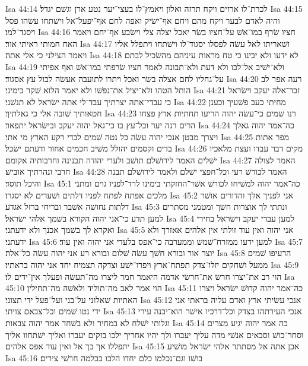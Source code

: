 Isa 44:14  לכרת־לו ארזים ויקח תרזה ואלון ויאמץ־לו בעצי־יער נטע ארן וגשׁם יגדל׃
Isa 44:15  והיה לאדם לבער ויקח מהם ויחם אף־ישׂיק ואפה לחם אף־יפעל־אל וישׁתחו עשׂהו פסל ויסגד־למו׃
Isa 44:16  חציו שׂרף במו־אשׁ על־חציו בשׂר יאכל יצלה צלי וישׂבע אף־יחם ויאמר האח חמותי ראיתי אור׃
Isa 44:17  ושׁאריתו לאל עשׂה לפסלו יסגוד־לו וישׁתחו ויתפלל אליו ויאמר הצילני כי אלי אתה׃
Isa 44:18  לא ידעו ולא יבינו כי טח מראות עיניהם מהשׂכיל לבתם׃
Isa 44:19  ולא־ישׁיב אל־לבו ולא דעת ולא־תבונה לאמר חציו שׂרפתי במו־אשׁ ואף אפיתי על־גחליו לחם אצלה בשׂר ואכל ויתרו לתועבה אעשׂה לבול עץ אסגוד׃
Isa 44:20  רעה אפר לב הותל הטהו ולא־יציל את־נפשׁו ולא יאמר הלוא שׁקר בימיני׃
Isa 44:21  זכר־אלה יעקב וישׂראל כי עבדי־אתה יצרתיך עבד־לי אתה ישׂראל לא תנשׁני׃
Isa 44:22  מחיתי כעב פשׁעיך וכענן חטאותיך שׁובה אלי כי גאלתיך׃
Isa 44:23  רנו שׁמים כי־עשׂה יהוה הריעו תחתיות ארץ פצחו הרים רנה יער וכל־עץ בו כי־גאל יהוה יעקב ובישׂראל יתפאר׃
Isa 44:24  כה־אמר יהוה גאלך ויצרך מבטן אנכי יהוה עשׂה כל נטה שׁמים לבדי רקע הארץ מי אתי׃
Isa 44:25  מפר אתות בדים וקסמים יהולל משׁיב חכמים אחור ודעתם ישׂכל׃
Isa 44:26  מקים דבר עבדו ועצת מלאכיו ישׁלים האמר לירושׁלם תושׁב ולערי יהודה תבנינה וחרבותיה אקומם׃
Isa 44:27  האמר לצולה חרבי ונהרתיך אובישׁ׃
Isa 44:28  האמר לכורשׁ רעי וכל־חפצי ישׁלם ולאמר לירושׁלם תבנה והיכל תוסד׃
Isa 45:1  כה־אמר יהוה למשׁיחו לכורשׁ אשׁר־החזקתי בימינו לרד־לפניו גוים ומתני מלכים אפתח לפתח לפניו דלתים ושׁערים לא יסגרו׃
Isa 45:2  אני לפניך אלך והדורים אושׁר דלתות נחושׁה אשׁבר ובריחי ברזל אגדע׃
Isa 45:3  ונתתי לך אוצרות חשׁך ומטמני מסתרים למען תדע כי־אני יהוה הקורא בשׁמך אלהי ישׂראל׃
Isa 45:4  למען עבדי יעקב וישׂראל בחירי ואקרא לך בשׁמך אכנך ולא ידעתני׃
Isa 45:5  אני יהוה ואין עוד זולתי אין אלהים אאזרך ולא ידעתני׃
Isa 45:6  למען ידעו ממזרח־שׁמשׁ וממערבה כי־אפס בלעדי אני יהוה ואין עוד׃
Isa 45:7  יוצר אור ובורא חשׁך עשׂה שׁלום ובורא רע אני יהוה עשׂה כל־אלה׃
Isa 45:8  הרעיפו שׁמים ממעל ושׁחקים יזלו־צדק תפתח־ארץ ויפרו־ישׁע וצדקה תצמיח יחד אני יהוה בראתיו׃
Isa 45:9  הוי רב את־יצרו חרשׂ את־חרשׂי אדמה היאמר חמר ליצרו מה־תעשׂה ופעלך אין־ידים לו׃
Isa 45:10  הוי אמר לאב מה־תוליד ולאשׁה מה־תחילין׃
Isa 45:11  כה־אמר יהוה קדושׁ ישׂראל ויצרו האתיות שׁאלוני על־בני ועל־פעל ידי תצוני׃
Isa 45:12  אנכי עשׂיתי ארץ ואדם עליה בראתי אני ידי נטו שׁמים וכל־צבאם צויתי׃
Isa 45:13  אנכי העירתהו בצדק וכל־דרכיו אישׁר הוא־יבנה עירי וגלותי ישׁלח לא במחיר ולא בשׁחד אמר יהוה צבאות׃
Isa 45:14  כה אמר יהוה יגיע מצרים וסחר־כושׁ וסבאים אנשׁי מדה עליך יעברו ולך יהיו אחריך ילכו בזקים יעברו ואליך ישׁתחוו אליך יתפללו אך בך אל ואין עוד אפס אלהים׃
Isa 45:15  אכן אתה אל מסתתר אלהי ישׂראל מושׁיע׃
Isa 45:16  בושׁו וגם־נכלמו כלם יחדו הלכו בכלמה חרשׁי צירים׃
